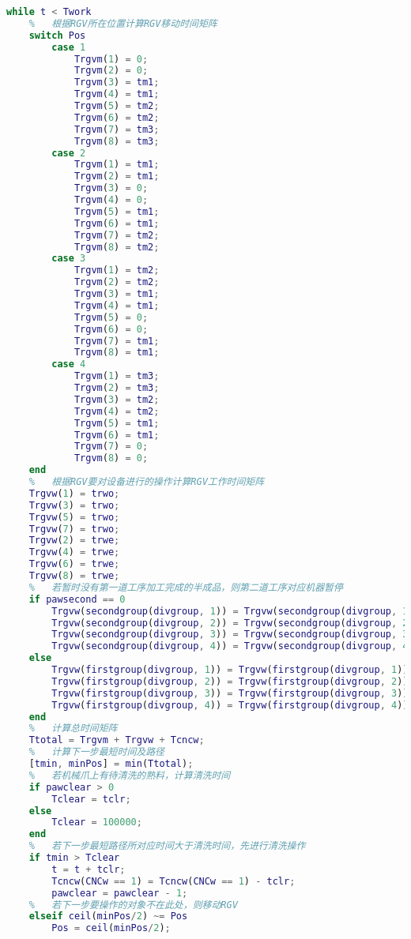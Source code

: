 \documentclass[no-math,withoutpreface,bwprint]{cumcmthesis} %
\numberwithin{equation}{section}
\numberwithin{figure}{section}
\numberwithin{table}{section}
\begin{document}
\begin{lstlisting}[language=matlab]
%   总时间不超过8小时
while t < Twork
    %   根据RGV所在位置计算RGV移动时间矩阵
    switch Pos
        case 1
            Trgvm(1) = 0;
            Trgvm(2) = 0;
            Trgvm(3) = tm1;
            Trgvm(4) = tm1;
            Trgvm(5) = tm2;
            Trgvm(6) = tm2;
            Trgvm(7) = tm3;
            Trgvm(8) = tm3;
        case 2
            Trgvm(1) = tm1;
            Trgvm(2) = tm1;
            Trgvm(3) = 0;
            Trgvm(4) = 0;
            Trgvm(5) = tm1;
            Trgvm(6) = tm1;
            Trgvm(7) = tm2;
            Trgvm(8) = tm2;               
        case 3
            Trgvm(1) = tm2;
            Trgvm(2) = tm2;
            Trgvm(3) = tm1;
            Trgvm(4) = tm1;
            Trgvm(5) = 0;
            Trgvm(6) = 0;
            Trgvm(7) = tm1;
            Trgvm(8) = tm1;
        case 4
            Trgvm(1) = tm3;
            Trgvm(2) = tm3;
            Trgvm(3) = tm2;
            Trgvm(4) = tm2;
            Trgvm(5) = tm1;
            Trgvm(6) = tm1;
            Trgvm(7) = 0;
            Trgvm(8) = 0;        
    end
    %   根据RGV要对设备进行的操作计算RGV工作时间矩阵
    Trgvw(1) = trwo;
    Trgvw(3) = trwo;
    Trgvw(5) = trwo;
    Trgvw(7) = trwo;
    Trgvw(2) = trwe;
    Trgvw(4) = trwe;
    Trgvw(6) = trwe;
    Trgvw(8) = trwe;
    %   若暂时没有第一道工序加工完成的半成品，则第二道工序对应机器暂停
    if pawsecond == 0
        Trgvw(secondgroup(divgroup, 1)) = Trgvw(secondgroup(divgroup, 1)) + 100000;
        Trgvw(secondgroup(divgroup, 2)) = Trgvw(secondgroup(divgroup, 2)) + 100000;
        Trgvw(secondgroup(divgroup, 3)) = Trgvw(secondgroup(divgroup, 3)) + 100000;
        Trgvw(secondgroup(divgroup, 4)) = Trgvw(secondgroup(divgroup, 4)) + 100000;
    else
        Trgvw(firstgroup(divgroup, 1)) = Trgvw(firstgroup(divgroup, 1)) + 100000;
        Trgvw(firstgroup(divgroup, 2)) = Trgvw(firstgroup(divgroup, 2)) + 100000;
        Trgvw(firstgroup(divgroup, 3)) = Trgvw(firstgroup(divgroup, 3)) + 100000;
        Trgvw(firstgroup(divgroup, 4)) = Trgvw(firstgroup(divgroup, 4)) + 100000;
    end
    %   计算总时间矩阵
    Ttotal = Trgvm + Trgvw + Tcncw;
    %   计算下一步最短时间及路径
    [tmin, minPos] = min(Ttotal);
    %   若机械爪上有待清洗的熟料，计算清洗时间
    if pawclear > 0
        Tclear = tclr;
    else
        Tclear = 100000;
    end
    %   若下一步最短路径所对应时间大于清洗时间，先进行清洗操作
    if tmin > Tclear
        t = t + tclr;
        Tcncw(CNCw == 1) = Tcncw(CNCw == 1) - tclr;
        pawclear = pawclear - 1;
    %   若下一步要操作的对象不在此处，则移动RGV
    elseif ceil(minPos/2) ~= Pos
        Pos = ceil(minPos/2);

\end{lstlisting}
\end{document}
